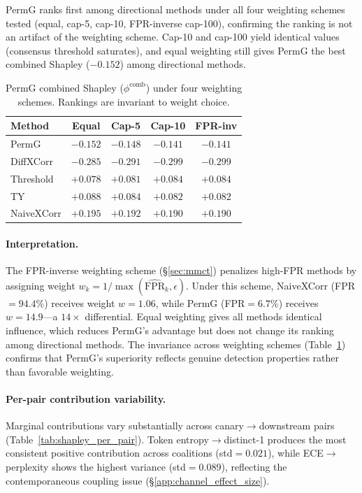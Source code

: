 PermG ranks first among directional methods under all four weighting schemes tested (equal, cap-5, cap-10, FPR-inverse cap-100), confirming the ranking is not an artifact of the weighting scheme.
Cap-10 and cap-100 yield identical values (consensus threshold saturates), and equal weighting still gives PermG the best combined Shapley ($-0.152$) among directional methods.

\begin{table}[H]
\centering
\small
\caption{PermG combined Shapley ($\phi^{\text{comb}}$) under four weighting schemes. Rankings are invariant to weight choice.}
\label{tab:weight_robustness}
\begin{tabular}{lcccc}
\toprule
Method & Equal & Cap-5 & Cap-10 & FPR-inv \\
\midrule
PermG & $-0.152$ & $-0.148$ & $-0.141$ & $-0.141$ \\
DiffXCorr & $-0.285$ & $-0.291$ & $-0.299$ & $-0.299$ \\
Threshold & $+0.078$ & $+0.081$ & $+0.084$ & $+0.084$ \\
TY & $+0.088$ & $+0.084$ & $+0.082$ & $+0.082$ \\
NaiveXCorr & $+0.195$ & $+0.192$ & $+0.190$ & $+0.190$ \\
\bottomrule
\end{tabular}
\end{table}

\paragraph{Interpretation.}
The FPR-inverse weighting scheme (\S\ref{sec:mmct}) penalizes high-FPR methods by assigning weight $w_k = 1/\max(\widehat{\mathrm{FPR}}_k, \epsilon)$.
Under this scheme, NaiveXCorr (FPR${=}94.4\%$) receives weight $w{=}1.06$, while PermG (FPR${=}6.7\%$) receives $w{=}14.9$---a $14{\times}$ differential.
Equal weighting gives all methods identical influence, which reduces PermG's advantage but does not change its ranking among directional methods.
The invariance across weighting schemes (Table~\ref{tab:weight_robustness}) confirms that PermG's superiority reflects genuine detection properties rather than favorable weighting.

\paragraph{Per-pair contribution variability.}
Marginal contributions vary substantially across canary$\to$downstream pairs (Table~\ref{tab:shapley_per_pair}).
Token entropy$\to$distinct-1 produces the most consistent positive contribution across coalitions (std${=}0.021$), while ECE$\to$perplexity shows the highest variance (std${=}0.089$), reflecting the contemporaneous coupling issue (\S\ref{app:channel_effect_size}).

